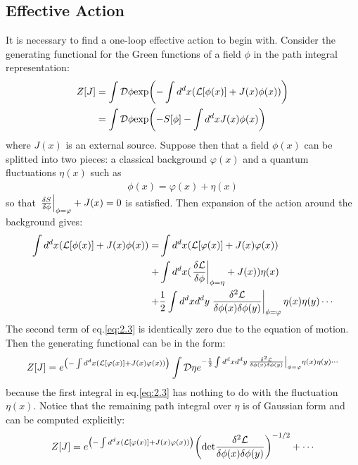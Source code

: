 \subsection{Effective Action}
It is necessary to find a one-loop effective action to begin with. Consider the generating functional for the Green functions of a field $\phi$ in the path integral representation: 
\begin{align}
    Z[J] &= \int \mathcal{D} \phi \text{exp} \qty (-\int d^{d} x (\mathcal{L} [\phi(x)] + J(x)\phi(x))) \\
    & = \int \mathcal{D} \phi \text{exp} \qty(-S[\phi] -\int d^{d} x J(x) \phi (x) ) \nonumber 
\end{align}
where $J(x)$ is an external source. Suppose then that a field $\phi(x)$ can be splitted into two pieces: a classical background $\varphi (x)$ and a quantum fluctuations $\eta (x)$ such as
\begin{align}
    \phi(x) = \varphi (x) + \eta (x)
\end{align} 
so that $\eval{\fdv{S}{\phi}} _{\phi = \varphi} + J(x) = 0$ is satisfied. Then expansion of the action around the background gives:
\begin{align}
    \label{eq:2.3}
    \begin{split}
    \int d^{d} x  (\mathcal{L}[\phi(x)] + J(x) \phi(x) ) = & \int d^{d}x  (\mathcal{L}[\varphi(x)] + J(x)\varphi(x))  \\
    + & \int d^{d} x (\eval{\fdv{\mathcal{L}}{\phi}} _{\phi = \eta} + J(x)) \eta(x) \\
    + & \frac{1}{2} \int d^{d}x d^{d}y \eval {\frac{\delta ^{2} \mathcal{L}}{\delta \phi(x) \delta \phi(y)}} _{\phi = \varphi} \eta(x)\eta(y) \cdots 
    \end{split}
\end{align}
The second term of eq.\ref{eq:2.3} is identically zero due to the equation of motion. Then the generating functional can be in the form:
\begin{align}
    Z[J] = e^ {\qty (-\int d^{d}x (\mathcal {L} [\varphi (x)] + J(x) \varphi (x)))} \int \mathcal {D} \eta e^{- \frac{1}{2} \int d^{d}x d^{d}y \eval {\frac{\delta ^{2} \mathcal{L}}{\delta \phi(x) \delta \phi(y)}} _{\phi = \varphi} \eta(x)\eta(y) \cdots}
\end{align}
because the first integral in eq.\ref{eq:2.3} has nothing to do with the  fluctuation $\eta(x)$. Notice that the remaining path integral over $\eta$ is of Gaussian form and can be computed explicitly:
\begin{align}
    Z[J] = e^ {\qty (-\int d^{d}x (\mathcal {L} [\varphi (x)] + J(x) \varphi (x)))} \qty (\text{det} \frac{\delta ^{2} \mathcal{L}}{\delta \phi(x) \delta \phi(y)})^{-1/2} + \cdots
\end{align}
